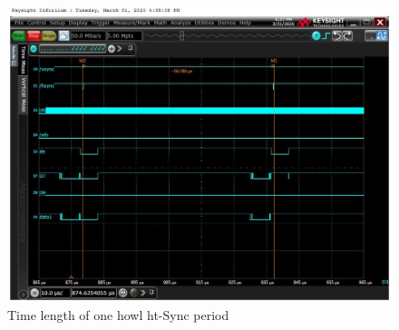 \newpage

\begin{figure}[ht]
\begin{center}
    \includegraphics[width=14cm]{pictures/lcd_timings/hsync_periode.jpg}
\end{center}
\caption{Time length of one howl ht-Sync period}
\label{fig:hsync_period}
\end{figure}

\newpage
